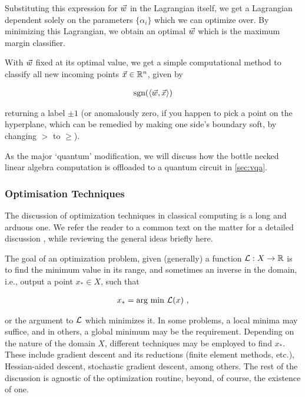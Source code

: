 Substituting this expression for \(\vec{w}\) in the Lagrangian itself, we get a
Lagrangian dependent solely on the parameters \(\{\alpha_i\}\) which we can
optimize over. By minimizing this Lagrangian, we obtain an optimal \(\vec{w}\)
which is the maximum margin classifier.

With \(\vec{w}\) fixed at its optimal value, we get a simple computational method
to classify all new incoming points \(\vec{x} \in \mathbb{R}^n\), given by

\begin{gather}
    \text{sgn}(\langle \vec{w}, \vec{x}\rangle)
    \label{eq:svmclassifier}
\end{gather}

returning a label \(\pm 1\) (or anomalously zero, if you happen to pick a point
on the hyperplane, which can be remedied by making one side's boundary soft, by
changing \(>\) to \(\geq\)).

As the major `quantum' modification, we will discuss how the bottle necked linear
algebra computation is offloaded to a quantum circuit in \autoref{sec:vqa}.

\subsubsection{Optimisation Techniques}
The discussion of optimization techniques in classical computing is a long and
arduous one. We refer the reader to a common text on the matter for a detailed
discussion \cite{boyd2004convex,nocedal2006numerical}, while reviewing the
general ideas briefly here.

The goal of an optimization problem, given (generally) a function
\(\mathcal{L}:X\to\mathbb{R}\) is to find the minimum value in its range, and sometimes an
inverse in the domain, i.e., output a point \(x_* \in X\), such that

\begin{gather*}
    x_* = \text{arg min } \mathcal{L}(x)~,
\end{gather*}

or the argument to \(\mathcal{L}\) which minimizes it. In some problems, a local
minima may suffice, and in others, a global minimum may be the requirement.
Depending on the nature of the domain \(X\), different techniques may be
employed to find \(x_*\). These include gradient descent and its reductions
(finite element methods, etc.), Hessian-aided descent,  stochastic gradient
descent, among others. The rest of the discussion is agnostic of the
optimization routine, beyond, of course, the existence of one.

